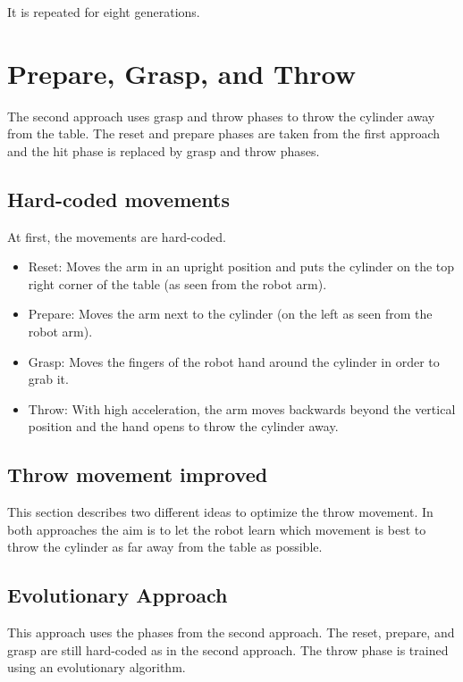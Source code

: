 It is repeated for eight generations. 


\section{Prepare, Grasp, and Throw} \label{sec:Throw}

The second approach uses grasp and throw phases to throw the cylinder away from the table. The reset and prepare phases are taken from the first approach and the hit phase is replaced by grasp and throw phases.

\subsection{Hard-coded movements}

At first, the movements are hard-coded.

\begin{itemize}
\item Reset: Moves the arm in an upright position and puts the cylinder on the top right corner of the table (as seen from the robot arm).
\item Prepare: Moves the arm next to the cylinder (on the left as seen from the robot arm).
\item Grasp: Moves the fingers of the robot hand around the cylinder in order to grab it.
\item Throw: With high acceleration, the arm moves backwards beyond the vertical position and the hand opens to throw the cylinder away.
\end{itemize}


\subsection{Throw movement improved} 

This section describes two different ideas to optimize the throw movement. In both approaches the aim is to let the robot learn which movement is best to throw the cylinder as far away from the table as possible.

\subsection{Evolutionary Approach} \label{subsec:EA}

This approach uses the phases from the second approach. The reset, prepare, and grasp are still hard-coded as in the second approach. The throw phase is trained using an evolutionary algorithm. 


